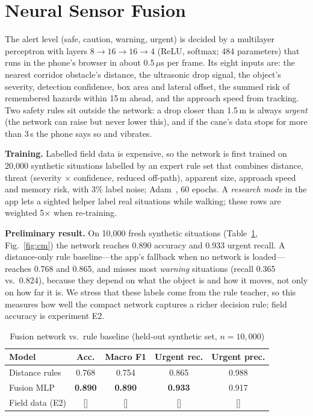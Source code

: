 \documentclass[conference]{IEEEtran}
\newcommand{\tbd}[1]{\textcolor{tbd}{[#1]}}
\begin{document}
\section{Neural Sensor Fusion}\label{sec:fusion}
The alert level (safe, caution, warning, urgent) is decided by a multilayer perceptron with layers $8 \to 16 \to 16 \to 4$ (ReLU, softmax; 484 parameters) that runs in the phone's browser in about 0.5\,$\mu$s per frame. Its eight inputs are: the nearest corridor obstacle's distance, the ultrasonic drop signal, the object's severity, detection confidence, box area and lateral offset, the summed risk of remembered hazards within 15\,m ahead, and the approach speed from tracking. Two safety rules sit outside the network: a drop closer than 1.5\,m is always \emph{urgent} (the network can raise but never lower this), and if the cane's data stops for more than 3\,s the phone says so and vibrates.

\textbf{Training.} Labelled field data is expensive, so the network is first trained on 20{,}000 synthetic situations labelled by an expert rule set that combines distance, threat (severity $\times$ confidence, reduced off-path), apparent size, approach speed and memory risk, with 3\% label noise; Adam~\cite{kingma2015}, 60 epochs. A \emph{research mode} in the app lets a sighted helper label real situations while walking; these rows are weighted 5$\times$ when re-training.

\textbf{Preliminary result.} On 10{,}000 fresh synthetic situations (Table~\ref{tab:fusion}, Fig.~\ref{fig:cm}) the network reaches 0.890 accuracy and 0.933 urgent recall. A distance-only rule baseline---the app's fallback when no network is loaded---reaches 0.768 and 0.865, and misses most \emph{warning} situations (recall 0.365 vs.\ 0.824), because they depend on what the object is and how it moves, not only on how far it is. We stress that these labels come from the rule teacher, so this measures how well the compact network captures a richer decision rule; field accuracy is experiment E2.

\begin{table}[t]
\caption{Fusion network vs.\ rule baseline (held-out synthetic set, $n = 10{,}000$)}
\label{tab:fusion}
\centering\footnotesize
\setlength{\tabcolsep}{4pt}
\begin{tabular}{@{}lcccc@{}}
\toprule
Model & Acc. & Macro F1 & Urgent rec. & Urgent prec. \\
\midrule
Distance rules & 0.768 & 0.754 & 0.865 & 0.988 \\
Fusion MLP & \textbf{0.890} & \textbf{0.890} & \textbf{0.933} & 0.917 \\
Field data (E2) & \tbd{} & \tbd{} & \tbd{} & \tbd{} \\
\bottomrule
\end{tabular}
\end{table}
\end{document}
